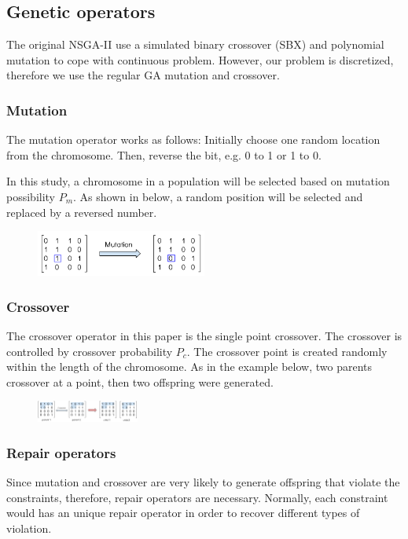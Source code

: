 \documentclass{llncs}
\begin{document}
\subsection{Genetic operators}
\label{sec:operators}
 The original NSGA-II use a simulated 
binary crossover (SBX) \cite{930314} and polynomial mutation \cite{Raghuwanshi04} to cope with continuous problem. 
However, our problem is discretized, therefore we use the regular GA mutation and crossover.


\subsubsection{Mutation}
The mutation operator works as follows: Initially choose one random location from the chromosome. 
Then, reverse the bit, e.g. 0 to 1 or 1 to 0. 

In this study, a chromosome in a population will be selected based on mutation possibility $P_{m}$. 
As shown in below, a random position will be selected and replaced by a reversed number.
\begin{figure}[ht]
\centering
	\includegraphics[width=0.5\textwidth]{pics/mutation.png}
\caption{}
\label{graph1}
\end{figure}
\subsubsection{Crossover}
The crossover operator in this paper is the single point crossover. 
The crossover is controlled by crossover probability $P_{c}$. 
The crossover point is created randomly within the length of the chromosome. 
As in the example below, two parents crossover at a point, then two offspring were generated.
\begin{figure}[ht]
\centering
	\includegraphics[width=0.3\textwidth]{pics/crossover.png}
\caption{}
\label{graph2}
\end{figure}


\subsubsection{Repair operators}
Since mutation and crossover are very likely to generate offspring that violate the constraints, therefore, 
repair operators are necessary. Normally, each constraint would has an unique repair operator 
in order to recover different types of violation.
\end{document}
